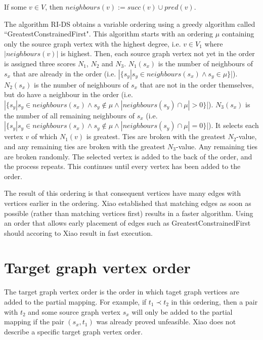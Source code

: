 \begin{defn}
If some $v\in V$, then $neighbours(v):= succ(v) \cup pred(v)$.
\end{defn}



The algorithm RI-DS obtains a variable ordering using a greedy algorithm called ``GreatestConstrainedFirst". This algorithm starts with an ordering $\mu$ containing only the source graph vertex with the highest degree, i.e. $v\in V_1$ where $|\mathit{neighbours}(v)|$ is highest. Then, each source graph vertex not yet in the order is assigned three scores $N_1$, $N_2$ and $N_3$. $N_1(s_x)$ is the number of neighbours of $s_x$ that are already in the order (i.e. $|\{s_y | s_y \in \mathit{neighbours}(s_x) \land s_y \in \mu\}$|). $N_2(s_x)$ is the number of neighbours of $s_x$ that are not in the order themselves, but do have a neighbour in the order (i.e. $|\{s_y | s_y \in \mathit{neighbours}(s_x) \land s_y \not \in \mu \land |\mathit{neighbours}(s_y) \cap \mu| > 0\}$|). $N_3(s_x)$ is the number of all remaining neighbours of $s_x$ (i.e. $|\{s_y | s_y \in \mathit{neighbours}(s_x) \land s_y \not \in \mu \land |\mathit{neighbours}(s_y) \cap \mu| = 0\}$|). It selects each vertex $v$ of which $N_1(v)$ is greatest. Ties are broken with the greatest $N_2$-value, and any remaining ties are broken with the greatest $N_3$-value. Any remaining ties are broken randomly. The selected vertex is added to the back of the order, and the process repeats. This continues until every vertex has been added to the order.

The result of this ordering is that consequent vertices have many edges with vertices earlier in the ordering. Xiao established that matching edges as soon as possible (rather than matching vertices first) results in a faster algorithm. Using an order that allows early placement of edges such as GreatestConstrainedFirst should accoring to Xiao result in fast execution.
\section{Target graph vertex order}
\label{sec:targetOrder}
The target graph vertex order is the order in which taget graph vertices are added to the partial mapping. For example, if $t_1 \prec t_2$ in this ordering, then a pair with $t_2$ and some source graph vertex $s_x$ will only be added to the partial mapping if the pair $(s_x, t_1)$ was already proved unfeasible. Xiao does not describe a specific target graph vertex order.

